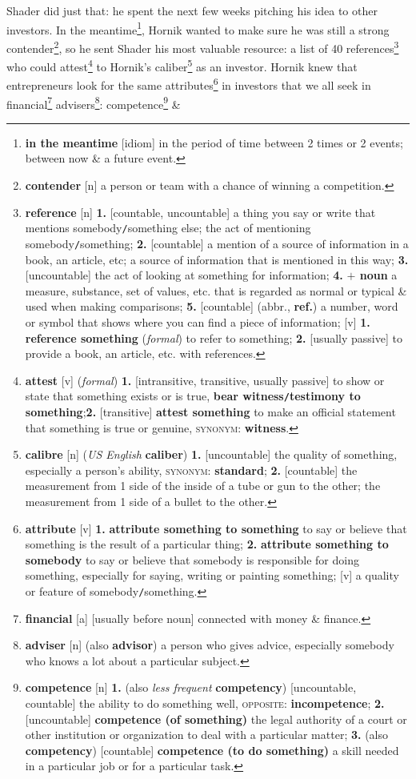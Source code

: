 \documentclass[oneside]{book}
\numberwithin{equation}{section}
\begin{document}
Shader did just that: he spent the next few weeks pitching his idea to other investors. In the meantime\footnote{\textbf{in the meantime} [idiom] in the period of time between 2 times or 2 events; between now \& a future event.}, Hornik wanted to make sure he was still a strong contender\footnote{\textbf{contender} [n] a person or team with a chance of winning a competition.}, so he sent Shader his most valuable resource: a list of 40 references\footnote{\textbf{reference} [n] \textbf{1.} [countable, uncountable] a thing you say or write that mentions somebody\texttt{/}something else; the act of mentioning somebody\texttt{/}something; \textbf{2.} [countable] a mention of a source of information in a book, an article, etc; a source of information that is mentioned in this way; \textbf{3.} [uncountable] the act of looking at something for information; \textbf{4.} \textbf{$+$ noun} a measure, substance, set of values, etc. that is regarded as normal or typical \& used when making comparisons; \textbf{5.} [countable] (abbr., \textbf{ref.}) a number, word or symbol that shows where you can find a piece of information; [v] \textbf{1.} \textbf{reference something} (\textit{formal}) to refer to something; \textbf{2.} [usually passive] to provide a book, an article, etc. with references.} who could attest\footnote{\textbf{attest} [v] (\textit{formal}) \textbf{1.} [intransitive, transitive, usually passive] to show or state that something exists or is true, \textbf{bear witness\texttt{/}testimony to something};\textbf{2.} [transitive] \textbf{attest something} to make an official statement that something is true or genuine, \textsc{synonym}: \textbf{witness}.} to Hornik's caliber\footnote{\textbf{calibre} [n] (\textit{US English} \textbf{caliber}) \textbf{1.} [uncountable] the quality of something, especially a person's ability, \textsc{synonym}: \textbf{standard}; \textbf{2.} [countable] the measurement from 1 side of the inside of a tube or gun to the other; the measurement from 1 side of a bullet to the other.} as an investor. Hornik knew that entrepreneurs look for the same attributes\footnote{\textbf{attribute} [v] \textbf{1.} \textbf{attribute something to something} to say or believe that something is the result of a particular thing; \textbf{2.} \textbf{attribute something to somebody} to say or believe that somebody is responsible for doing something, especially for saying, writing or painting something; [v] a quality or feature of somebody\texttt{/}something.} in investors that we all seek in financial\footnote{\textbf{financial} [a] [usually before noun] connected with money \& finance.} advisers\footnote{\textbf{adviser} [n] (also \textbf{advisor}) a person who gives advice, especially somebody who knows a lot about a particular subject.}: competence\footnote{\textbf{competence} [n] \textbf{1.} (also \textit{less frequent} \textbf{competency}) [uncountable, countable] the ability to do something well, \textsc{opposite}: \textbf{incompetence}; \textbf{2.} [uncountable] \textbf{competence (of something)} the legal authority of a court or other institution or organization to deal with a particular matter; \textbf{3.} (also \textbf{competency}) [countable] \textbf{competence (to do something)} a skill needed in a particular job or for a particular task.} \& 
\end{document}
